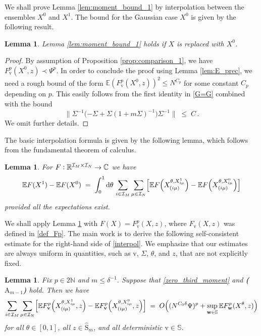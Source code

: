 \documentclass[11pt]{article} %
\numberwithin{equation}{section}
\numberwithin{figure}{section}
\theoremstyle{plain} %
\newtheorem{lemma}[theorem]{Lemma}
\theoremstyle{definition} %
\newcommand{\f}[1]{\boldsymbol{\mathrm{#1}}} %
\newcommand{\bb}{\mathbb} %
\renewcommand{\cal}{\mathcal}
\newcommand{\wh}{\widehat}
\newcommand{\E}{\mathbb{E}}
\newcommand{\R}{\mathbb{R}}
\newcommand{\C}{\mathbb{C}}
\newcommand{\N}{\mathbb{N}}
\newcommand{\dd}{\mathrm{d}}
\newcommand{\col}{\mathrel{\vcenter{\baselineskip0.75ex \lineskiplimit0pt \hbox{.}\hbox{.}}}}
\renewcommand{\leq}{\leqslant}
\newcommand{\pb}[1]{\bigl({#1}\bigr)}
\newcommand{\pB}[1]{\Bigl({#1}\Bigr)}
\newcommand{\qB}[1]{\Bigl[{#1}\Bigr]}
\newcommand{\normb}[1]{\bigl\lVert #1 \bigr\rVert}
\begin{document}
We shall prove Lemma \ref{lem:moment_bound_1} by interpolation between the ensembles $X^0$ and $X^1$. The bound for the Gaussian case $X^0$ is given by the following result.
\begin{lemma} \label{lem:comparison_0}
Lemma \ref{lem:moment_bound_1} holds if $X$ is replaced with $X^0$.
\end{lemma}
\begin{proof}
By assumption of Proposition \ref{prop:comparison_1}, we have $F_{\f v}^p(X^0,z) \prec \Psi^p$. In order to conclude the proof using Lemma \ref{lem:E_prec}, we need a rough bound of the form $\E (F_{\f v}^p(X^0,z))^2 \leq N^{C_p}$ for some constant $C_p$ depending on $p$. This easily follows from the first identity in \eqref{G=G} combined with the bound
\begin{equation*}
\normb{\Sigma^{-1} \pb{-\Sigma + \Sigma (1 + m \Sigma)^{-1}} \Sigma^{-1}} \;\leq\; C\,.
\end{equation*}
We omit further details.
\end{proof}



The basic interpolation formula is given by the following lemma, which follows from the fundamental theorem of calculus.

\begin{lemma} \label{lem:interpol}
For $F \col \R^{\cal I_M \times \cal I_N} \to \C$ we have
\begin{equation} \label{interpol}
\E F(X^1) - \E F(X^0) \;=\; \int_0^1 \dd \theta \, \sum_{i \in \cal I_M} \sum_{\mu \in \cal I_N} \qB{ \E F \pB{X^{\theta,X^{1}_{i \mu}}_{(i \mu)}} - \E F \pB{X^{\theta,X^{0}_{i \mu}}_{(i \mu)}}}
\end{equation}
provided all the expectations exist.
\end{lemma}

We shall apply Lemma \ref{lem:interpol} with $F(X) = F_{\f v}^p(X,z)$, where $F_{\f v}(X,z)$ was defined in \eqref{def_Fp}. The main work is to derive the following self-consistent estimate for the right-hand side of \eqref{interpol}. We emphasize that our estimates are always uniform in quantities, such as $\f v$, $\Sigma$, $\theta$, and $z$, that are not explicitly fixed.

\begin{lemma} \label{lem:main_comparison}
Fix $p \in 2 \N$ and $m \leq \delta^{-1}$. Suppose that \eqref{zero_third_moment} and \textbf{($\f A_{m - 1}$)} hold.
Then we have
\begin{equation} \label{main_comparison}
\sum_{i \in \cal I_M} \sum_{\mu \in \cal I_N} \qB{ \E F_{\f v}^p \pB{X^{\theta,X^1_{i \mu}}_{(i \mu)}, z} - \E F_{\f v}^p \pB{X^{\theta,X^0_{i \mu}}_{(i \mu)}, z}} \;=\; O \pB{(N^{C_0 \delta}\Psi)^p + \sup_{\f w \in \bb S} \E F_{\f w}^p(X^\theta, z)}
\end{equation}
for all $\theta \in [0,1]$, all $z \in \wh{\f S}_m$, and all deterministic $\f v \in \bb S$.
\end{lemma}
\end{document}
